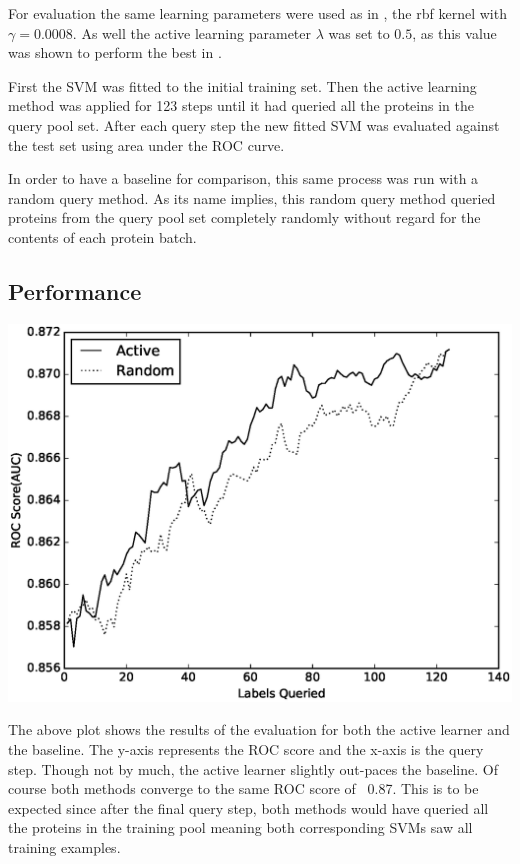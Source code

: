 \documentclass{article}
\begin{document}
For evaluation the same learning parameters were used as in \cite{dbsi_server}, the rbf kernel with $\gamma = 0.0008$. As well the active learning parameter $\lambda$ was set to $0.5$, as this value was shown to perform the best in \cite{active_learning}.

First the SVM was fitted to the initial training set. Then the active learning method was applied for 123 steps until it had queried all the proteins in the query pool set. After each query step the new fitted SVM was evaluated against the test set using area under the ROC curve. 

In order to have a baseline for comparison, this same process was run with a random query method. As its name implies, this random query method queried proteins from the query pool set completely randomly without regard for the contents of each protein batch. 
\subsection*{Performance}

\includegraphics[scale=0.5]{plot}

The above plot shows the results of the evaluation for both the active learner and the baseline. The y-axis represents the ROC score and the x-axis is the query step. Though not by much, the active learner slightly out-paces the baseline. Of course both methods converge to the same ROC score of ~0.87. This is to be expected since after the final query step, both methods would have queried all the proteins in the training pool meaning both corresponding SVMs saw all training examples.
\end{document}
